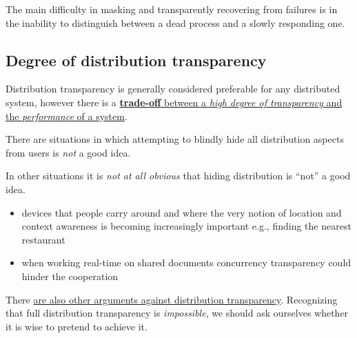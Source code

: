 The main difficulty in masking and transparently recovering from failures is in the inability to
distinguish between a dead process and a slowly responding one.


\subsection{Degree of distribution transparency}
Distribution transparency is generally considered preferable for any distributed system, however there is a \ul{\textbf{trade-off} between a \textit{high degree of transparency} and the \textit{performance} of a system}.

There are situations in which attempting to blindly hide all distribution aspects from users is \textit{not} a good idea.


{In other situations it is \textit{not at all obvious} that hiding distribution is ``not'' a good idea.\ns
\begin{itemize}
   \item devices that people carry around and where the very notion of location and context awareness is becoming increasingly important
   e.g., finding the nearest restaurant
   \item when working real-time on shared documents concurrency transparency could hinder the cooperation
\end{itemize}}

There \ul{are also other arguments against distribution transparency}.
Recognizing that full distribution transparency is \textit{impossible}, we should ask ourselves whether it is wise to pretend to achieve it.

